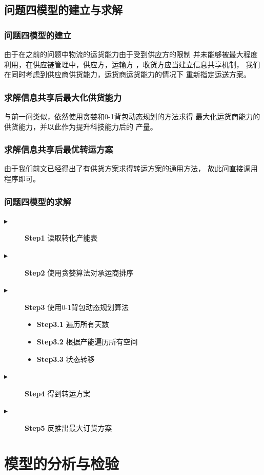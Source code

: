 \documentclass{cumcmthesis}
\begin{document}
\subsection{问题四模型的建立与求解}
\subsubsection{问题四模型的建立}
由于在之前的问题中物流的运货能力由于受到供应方的限制
并未能够被最大程度利用，在供应链管理中，供应方，运输方
，收货方应当建立信息共享机制，
我们在同时考虑到供应商供货能力，运货商运货能力的情况下
重新指定运送方案。
\subsubsection*{求解信息共享后最大化供货能力}
与前一问类似，依然使用贪婪和0-1背包动态规划的方法求得
最大化运货商能力的供货能力，并以此作为提升科技能力后的
产量。
\subsubsection*{求解信息共享后最优转运方案}
由于我们前文已经得出了有供货方案求得转运方案的通用方法，
故此问直接调用程序即可。

\subsubsection{问题四模型的求解}
\begin{description}
    \item[$\blacktriangleright$] \textbf{Step1} 读取转化产能表
    \item[$\blacktriangleright$] \textbf{Step2} 使用贪婪算法对承运商排序
    \item[$\blacktriangleright$] \textbf{Step3} 使用0-1背包动态规划算法
        \begin{itemize}
            \item \textbf{Step3.1} 遍历所有天数
            \item \textbf{Step3.2} 根据产能遍历所有空间
            \item \textbf{Step3.3} 状态转移
        \end{itemize}
    \item[$\blacktriangleright$] \textbf{Step4} 得到转运方案
    \item[$\blacktriangleright$] \textbf{Step5} 反推出最大订货方案
\end{description}



\section{模型的分析与检验}
\end{document}
